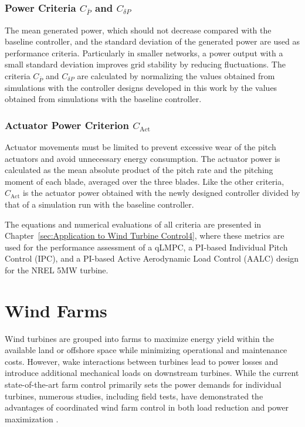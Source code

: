 \subsubsection{Power Criteria $C_{\bar{P}}$ and $C_{\delta P}$}
The mean generated power, which should not decrease compared with the baseline controller, and the standard deviation of the generated power are used as performance criteria. Particularly in smaller networks, a power output with a small standard deviation improves grid stability by reducing fluctuations. The criteria $C_{\bar{P}}$ and $C_{\delta P}$ are calculated by normalizing the values obtained from simulations with the controller designs developed in this work by the values obtained from simulations with the baseline controller.

\subsubsection{Actuator Power Criterion $C_{\text{Act}}$}
Actuator movements must be limited to prevent excessive wear of the pitch actuators and avoid unnecessary energy consumption. The actuator power is calculated as the mean absolute product of the pitch rate and the pitching moment of each blade, averaged over the three blades. Like the other criteria, $C_{\text{Act}}$ is the actuator power obtained with the newly designed controller divided by that of a simulation run with the baseline controller.

The equations and numerical evaluations of all criteria are presented in Chapter~\ref{sec:Application to Wind Turbine Control4}, where these metrics are used for the performance assessment of a qLMPC, a PI-based Individual Pitch Control (IPC), and a PI-based Active Aerodynamic Load Control (AALC) design for the NREL 5MW turbine.


\section{Wind Farms}\label{sec:WakeModels}

Wind turbines are grouped into farms to maximize energy yield within the available land or offshore space while minimizing operational and maintenance costs. However, wake interactions between turbines lead to power losses and introduce additional mechanical loads on downstream turbines. While the current state-of-the-art farm control primarily sets the power demands for individual turbines, numerous studies, including field tests, have demonstrated the advantages of coordinated wind farm control in both load reduction and power maximization \cite{houck2022review}.

